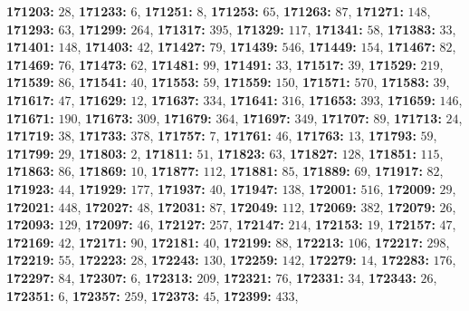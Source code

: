 \textsf{\bfseries 171203:} $28$, \textsf{\bfseries 171233:} $6$, \textsf{\bfseries 171251:} $8$, \textsf{\bfseries 171253:} $65$, \textsf{\bfseries 171263:} $87$, \textsf{\bfseries 171271:} $148$, \textsf{\bfseries 171293:} $63$, \textsf{\bfseries 171299:} $264$, \textsf{\bfseries 171317:} $395$, \textsf{\bfseries 171329:} $117$, \textsf{\bfseries 171341:} $58$, \textsf{\bfseries 171383:} $33$, \textsf{\bfseries 171401:} $148$, \textsf{\bfseries 171403:} $42$, \textsf{\bfseries 171427:} $79$, \textsf{\bfseries 171439:} $546$, \textsf{\bfseries 171449:} $154$, \textsf{\bfseries 171467:} $82$, \textsf{\bfseries 171469:} $76$, \textsf{\bfseries 171473:} $62$, \textsf{\bfseries 171481:} $99$, \textsf{\bfseries 171491:} $33$, \textsf{\bfseries 171517:} $39$, \textsf{\bfseries 171529:} $219$, \textsf{\bfseries 171539:} $86$, \textsf{\bfseries 171541:} $40$, \textsf{\bfseries 171553:} $59$, \textsf{\bfseries 171559:} $150$, \textsf{\bfseries 171571:} $570$, \textsf{\bfseries 171583:} $39$, \textsf{\bfseries 171617:} $47$, \textsf{\bfseries 171629:} $12$, \textsf{\bfseries 171637:} $334$, \textsf{\bfseries 171641:} $316$, \textsf{\bfseries 171653:} $393$, \textsf{\bfseries 171659:} $146$, \textsf{\bfseries 171671:} $190$, \textsf{\bfseries 171673:} $309$, \textsf{\bfseries 171679:} $364$, \textsf{\bfseries 171697:} $349$, \textsf{\bfseries 171707:} $89$, \textsf{\bfseries 171713:} $24$, \textsf{\bfseries 171719:} $38$, \textsf{\bfseries 171733:} $378$, \textsf{\bfseries 171757:} $7$, \textsf{\bfseries 171761:} $46$, \textsf{\bfseries 171763:} $13$, \textsf{\bfseries 171793:} $59$, \textsf{\bfseries 171799:} $29$, \textsf{\bfseries 171803:} $2$, \textsf{\bfseries 171811:} $51$, \textsf{\bfseries 171823:} $63$, \textsf{\bfseries 171827:} $128$, \textsf{\bfseries 171851:} $115$, \textsf{\bfseries 171863:} $86$, \textsf{\bfseries 171869:} $10$, \textsf{\bfseries 171877:} $112$, \textsf{\bfseries 171881:} $85$, \textsf{\bfseries 171889:} $69$, \textsf{\bfseries 171917:} $82$, \textsf{\bfseries 171923:} $44$, \textsf{\bfseries 171929:} $177$, \textsf{\bfseries 171937:} $40$, \textsf{\bfseries 171947:} $138$, \textsf{\bfseries 172001:} $516$, \textsf{\bfseries 172009:} $29$, \textsf{\bfseries 172021:} $448$, \textsf{\bfseries 172027:} $48$, \textsf{\bfseries 172031:} $87$, \textsf{\bfseries 172049:} $112$, \textsf{\bfseries 172069:} $382$, \textsf{\bfseries 172079:} $26$, \textsf{\bfseries 172093:} $129$, \textsf{\bfseries 172097:} $46$, \textsf{\bfseries 172127:} $257$, \textsf{\bfseries 172147:} $214$, \textsf{\bfseries 172153:} $19$, \textsf{\bfseries 172157:} $47$, \textsf{\bfseries 172169:} $42$, \textsf{\bfseries 172171:} $90$, \textsf{\bfseries 172181:} $40$, \textsf{\bfseries 172199:} $88$, \textsf{\bfseries 172213:} $106$, \textsf{\bfseries 172217:} $298$, \textsf{\bfseries 172219:} $55$, \textsf{\bfseries 172223:} $28$, \textsf{\bfseries 172243:} $130$, \textsf{\bfseries 172259:} $142$, \textsf{\bfseries 172279:} $14$, \textsf{\bfseries 172283:} $176$, \textsf{\bfseries 172297:} $84$, \textsf{\bfseries 172307:} $6$, \textsf{\bfseries 172313:} $209$, \textsf{\bfseries 172321:} $76$, \textsf{\bfseries 172331:} $34$, \textsf{\bfseries 172343:} $26$, \textsf{\bfseries 172351:} $6$, \textsf{\bfseries 172357:} $259$, \textsf{\bfseries 172373:} $45$, \textsf{\bfseries 172399:} $433$, 
